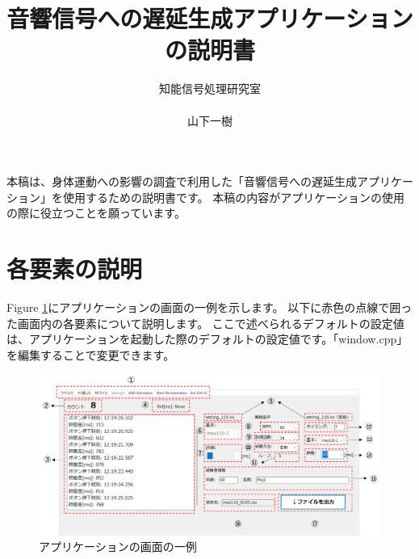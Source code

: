 \documentclass{article} %
\title{音響信号への遅延生成アプリケーションの説明書} %
\author{知能信号処理研究室\\\\山下一樹} %
\begin{document}

\maketitle %
本稿は、身体運動への影響の調査で利用した「音響信号への遅延生成アプリケーション」を使用するための説明書です。
本稿の内容がアプリケーションの使用の際に役立つことを願っています。
\section{各要素の説明} 
Figure \ref{fig:app_kyakkann}にアプリケーションの画面の一例を示します。
以下に赤色の点線で囲った画面内の各要素について説明します。
ここで述べられるデフォルトの設定値は、アプリケーションを起動した際のデフォルトの設定値です。「window.cpp」を編集することで変更できます。
\begin{figure}[tbp]
  \centering
  \includegraphics[scale=0.5]{figures_app_1.pdf}
  \caption{アプリケーションの画面の一例}
  \label{fig:app_kyakkann}
\end{figure}
\end{document}
